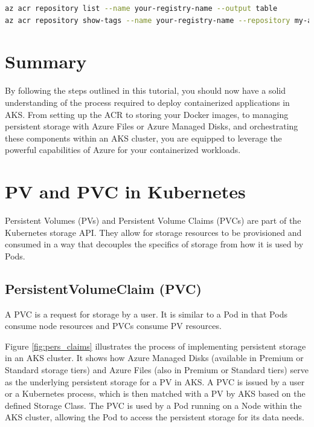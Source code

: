\documentclass{article}
\begin{document}
\begin{lstlisting}[language=bash]
az acr repository list --name your-registry-name --output table
az acr repository show-tags --name your-registry-name --repository my-app --output table
\end{lstlisting}


\section*{Summary}

By following the steps outlined in this tutorial, you should now have a solid understanding of the process required to deploy containerized applications in AKS. From setting up the ACR to storing your Docker images, to managing persistent storage with Azure Files or Azure Managed Disks, and orchestrating these components within an AKS cluster, you are equipped to leverage the powerful capabilities of Azure for your containerized workloads.

\appendix


\section{PV and PVC in Kubernetes}  

Persistent Volumes (PVs) and Persistent Volume Claims (PVCs) \cite{azurestorage} are part of the Kubernetes storage API. They allow for storage resources to be provisioned and consumed in a way that decouples the specifics of storage from how it is used by Pods.  

\subsection{PersistentVolumeClaim (PVC)} \label{pvc}  

A PVC is a request for storage by a user. It is similar to a Pod in that Pods consume node resources and PVCs consume PV resources.

Figure \ref{fig:pers_claims} illustrates the process of implementing persistent storage in an AKS cluster. It shows how Azure Managed Disks (available in Premium or Standard storage tiers) and Azure Files (also in Premium or Standard tiers) serve as the underlying persistent storage for a PV in AKS. A PVC is issued by a user or a Kubernetes process, which is then matched with a PV by AKS based on the defined Storage Class. The PVC is used by a Pod running on a Node within the AKS cluster, allowing the Pod to access the persistent storage for its data needs.
\end{document}
